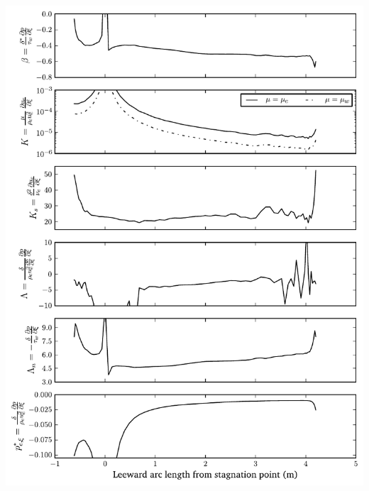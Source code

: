 \documentclass[mathserif]{beamer}
\begin{document}
\begin{frame}
\begin{columns}[c]
\begin{column}{0.5\linewidth}
            \includegraphics[height=0.99\textheight]{cevisslam_summary_fpg}
        \end{column}
    \end{columns}
\end{frame}
\end{document}

